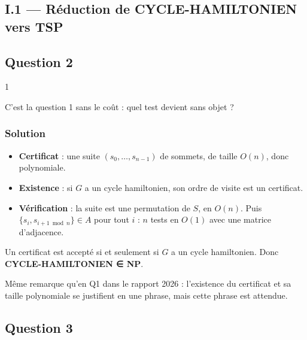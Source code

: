 \documentclass[11pt,a4paper]{article}
\providecommand{\tightlist}{\setlength{\itemsep}{0pt}\setlength{\parskip}{0pt}}
\begin{document}
\hypertarget{i.1-ruxe9duction-de-cycle-hamiltonien-vers-tsp}{%
\subsection{I.1 --- Réduction de CYCLE-HAMILTONIEN vers TSP}\label{i.1-ruxe9duction-de-cycle-hamiltonien-vers-tsp}}

\hypertarget{question-2}{%
\subsection{Question 2}\label{question-2}}

\begin{indication}{1}

C'est la question 1 sans le coût : quel test devient sans objet ?

\end{indication}

\hypertarget{solution-1}{%
\subsubsection{Solution}\label{solution-1}}

\begin{itemize}
\tightlist
\item
  \textbf{Certificat} : une suite \((s_0,\dots,s_{n-1})\) de sommets, de taille \(O(n)\), donc polynomiale.
\item
  \textbf{Existence} : si \(G\) a un cycle hamiltonien, son ordre de visite est un certificat.
\item
  \textbf{Vérification} : la suite est une permutation de \(S\), en \(O(n)\). Puis \(\{s_i,s_{i+1\bmod n}\}\in A\) pour tout \(i\) : \(n\) tests en \(O(1)\) avec une matrice d'adjacence.
\end{itemize}

Un certificat est accepté si et seulement si \(G\) a un cycle hamiltonien. Donc \textbf{CYCLE-HAMILTONIEN ∈ NP}.

\begin{jury}

Même remarque qu'en Q1 dans le rapport 2026 : l'existence du certificat et sa taille polynomiale se justifient en une phrase, mais cette phrase est attendue.

\end{jury}

\hypertarget{question-3}{%
\subsection{Question 3}\label{question-3}}
\end{document}
